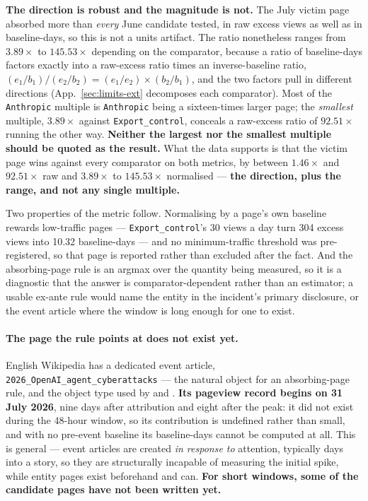 \documentclass[11pt,a4paper]{article}
\begin{document}
\noindent \textbf{The direction is robust and the magnitude is not.} The July
victim page absorbed more than \emph{every} June candidate tested, in raw excess
views as well as in baseline-days, so this is not a units artifact. The ratio
nonetheless ranges from $3.89\times$ to $145.53\times$ depending on the
comparator, because a ratio of baseline-days factors exactly into a raw-excess
ratio times an inverse-baseline ratio,
$(e_1/b_1)/(e_2/b_2) = (e_1/e_2)\times(b_2/b_1)$, and the two factors pull in
different directions (App.~\ref{sec:limits-ext} decomposes each comparator).
Most of the \texttt{Anthropic} multiple is \texttt{Anthropic} being a
sixteen-times larger page; the \emph{smallest} multiple, $3.89\times$ against
\texttt{Export\_control}, conceals a raw-excess ratio of $92.51\times$ running
the other way. \textbf{Neither the largest nor the smallest multiple should be
quoted as the result.} What the data supports is that the victim page wins
against every comparator on both metrics, by between $1.46\times$ and
$92.51\times$ raw and $3.89\times$ to $145.53\times$ normalised --- \textbf{the
direction, plus the range, and not any single multiple.}

Two properties of the metric follow. Normalising by a page's own baseline
rewards low-traffic pages --- \texttt{Export\_control}'s 30 views a day turn 304
excess views into 10.32 baseline-days --- and no minimum-traffic threshold was
pre-registered, so that page is reported rather than excluded after the fact.
And the absorbing-page rule is an argmax over the quantity being measured, so it
is a diagnostic that the answer is comparator-dependent rather than an
estimator; a usable ex-ante rule would name the entity in the incident's primary
disclosure, or the event article where the window is long enough for one to
exist.

\paragraph{The page the rule points at does not exist yet.} English Wikipedia has
a dedicated event article, \texttt{2026\_OpenAI\_agent\_cyberattacks} --- the
natural object for an absorbing-page rule, and the object type used by
\cite{garciagavilanes2016crashes} and \cite{igarashi2022twophase}. \textbf{Its
pageview record begins on 31 July 2026}, nine days after attribution and eight
after the peak: it did not exist during the 48-hour window, so its contribution
is undefined rather than small, and with no pre-event baseline its baseline-days
cannot be computed at all. This is general --- event articles are created
\emph{in response to} attention, typically days into a story, so they are
structurally incapable of measuring the initial spike, while entity pages exist
beforehand and can. \textbf{For short windows, some of the candidate pages have
not been written yet.}
\end{document}
